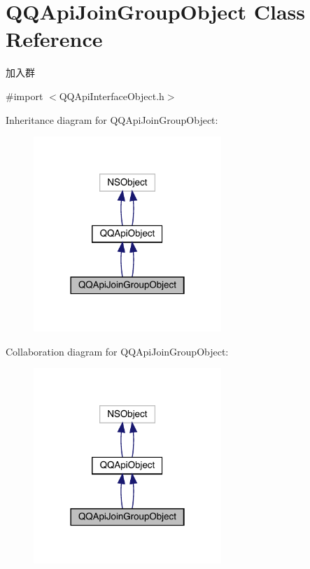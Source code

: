 \hypertarget{interface_q_q_api_join_group_object}{}\section{Q\+Q\+Api\+Join\+Group\+Object Class Reference}
\label{interface_q_q_api_join_group_object}


加入群  




{\ttfamily \#import $<$Q\+Q\+Api\+Interface\+Object.\+h$>$}



Inheritance diagram for Q\+Q\+Api\+Join\+Group\+Object\+:\nopagebreak
\begin{figure}[H]
\begin{center}
\leavevmode
\includegraphics[width=201pt]{interface_q_q_api_join_group_object__inherit__graph}
\end{center}
\end{figure}


Collaboration diagram for Q\+Q\+Api\+Join\+Group\+Object\+:\nopagebreak
\begin{figure}[H]
\begin{center}
\leavevmode
\includegraphics[width=201pt]{interface_q_q_api_join_group_object__coll__graph}
\end{center}
\end{figure}
